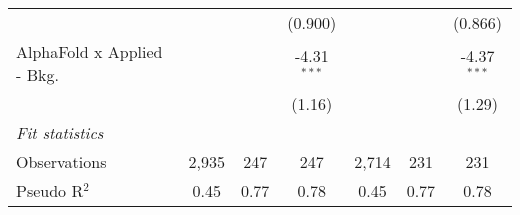 \begin{tabular}{lcccccc}
                                &               &         & (0.900)       &               &        & (0.866)\\   
   AlphaFold x Applied - Bkg.   &               &         & -4.31$^{***}$ &               &        & -4.37$^{***}$\\   
                                &               &         & (1.16)        &               &        & (1.29)\\   
   \midrule
   \emph{Fit statistics}\\
   Observations                 & 2,935         & 247     & 247           & 2,714         & 231    & 231\\  
   Pseudo R$^2$                 & 0.45          & 0.77    & 0.78          & 0.45          & 0.77   & 0.78\\  
   

\end{tabular}
